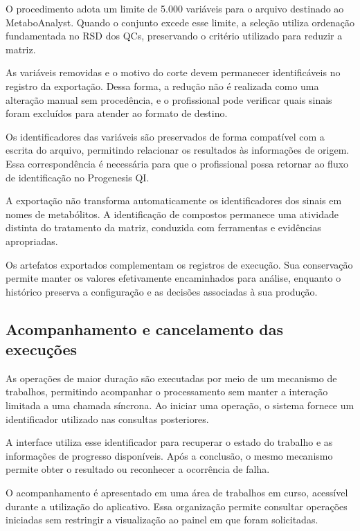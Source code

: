 O procedimento adota um limite de 5.000 variáveis para o arquivo destinado ao MetaboAnalyst. Quando o conjunto excede esse limite, a seleção utiliza ordenação fundamentada no RSD dos QCs, preservando o critério utilizado para reduzir a matriz.

As variáveis removidas e o motivo do corte devem permanecer identificáveis no registro da exportação. Dessa forma, a redução não é realizada como uma alteração manual sem procedência, e o profissional pode verificar quais sinais foram excluídos para atender ao formato de destino.

Os identificadores das variáveis são preservados de forma compatível com a escrita do arquivo, permitindo relacionar os resultados às informações de origem. Essa correspondência é necessária para que o profissional possa retornar ao fluxo de identificação no Progenesis QI.

A exportação não transforma automaticamente os identificadores dos sinais em nomes de metabólitos. A identificação de compostos permanece uma atividade distinta do tratamento da matriz, conduzida com ferramentas e evidências apropriadas.

Os artefatos exportados complementam os registros de execução. Sua conservação permite manter os valores efetivamente encaminhados para análise, enquanto o histórico preserva a configuração e as decisões associadas à sua produção.

\subsection{Acompanhamento e cancelamento das execuções}
\label{subsec:acompanhamento-cancelamento}

As operações de maior duração são executadas por meio de um mecanismo de trabalhos, permitindo acompanhar o processamento sem manter a interação limitada a uma chamada síncrona. Ao iniciar uma operação, o sistema fornece um identificador utilizado nas consultas posteriores.

A interface utiliza esse identificador para recuperar o estado do trabalho e as informações de progresso disponíveis. Após a conclusão, o mesmo mecanismo permite obter o resultado ou reconhecer a ocorrência de falha.

O acompanhamento é apresentado em uma área de trabalhos em curso, acessível durante a utilização do aplicativo. Essa organização permite consultar operações iniciadas sem restringir a visualização ao painel em que foram solicitadas.

